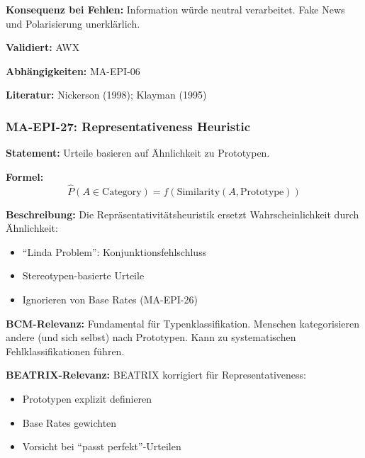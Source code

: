 \textbf{Konsequenz bei Fehlen:}
Information würde neutral verarbeitet. Fake News und Polarisierung unerklärlich.

\textbf{Validiert:} AWX

\textbf{Abhängigkeiten:} MA-EPI-06

\textbf{Literatur:} Nickerson (1998); Klayman (1995)



\subsubsection*{MA-EPI-27: Representativeness Heuristic}

\textbf{Statement:} Urteile basieren auf Ähnlichkeit zu Prototypen.

\textbf{Formel:}
\begin{equation}
\hat{P}(A \in \text{Category}) = f(\text{Similarity}(A, \text{Prototype}))
\end{equation}

\textbf{Beschreibung:}
Die Repräsentativitätsheuristik ersetzt Wahrscheinlichkeit durch Ähnlichkeit:
\begin{itemize}
    \item ``Linda Problem'': Konjunktionsfehlschluss
    \item Stereotypen-basierte Urteile
    \item Ignorieren von Base Rates (MA-EPI-26)
\end{itemize}

\textbf{BCM-Relevanz:}
Fundamental für Typenklassifikation. Menschen kategorisieren andere (und sich selbst) nach Prototypen. Kann zu systematischen Fehlklassifikationen führen.

\textbf{BEATRIX-Relevanz:}
BEATRIX korrigiert für Representativeness:
\begin{itemize}
    \item Prototypen explizit definieren
    \item Base Rates gewichten
    \item Vorsicht bei ``passt perfekt''-Urteilen
\end{itemize}

